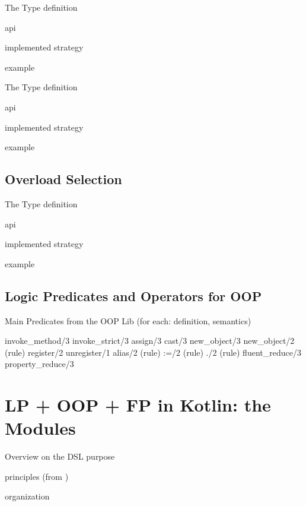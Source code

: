 \documentclass[handout]{beamer}
\begin{document}
\begin{frame}[allowframebreaks]{The  Type}
    definition

    api

    implemented strategy

    example
\end{frame}

\begin{frame}[allowframebreaks]{The  Type}
    definition

    api

    implemented strategy

    example
\end{frame}

\subsection{Overload Selection}

\begin{frame}[allowframebreaks]{The  Type}
    definition

    api

    implemented strategy

    example
\end{frame}

\subsection{Logic Predicates and Operators for OOP}

\begin{frame}[allowframebreaks]{Main Predicates from the OOP Lib}
    (for each: definition, semantics)

    \ttfamily
    invoke\_method/3
    invoke\_strict/3
    assign/3
    cast/3
    new\_object/3
    new\_object/2 (rule)
    register/2
    unregister/1
    alias/2 (rule)
    :=/2 (rule)
    ./2 (rule)
    fluent\_reduce/3
    property\_reduce/3
\end{frame}

\section{LP + OOP + FP in Kotlin: the  Modules}

\begin{frame}[allowframebreaks]{Overview on the DSL}
    purpose

    principles (from \cite{kotlinDSl4PrologWoa2020})

    organization
\end{frame}
\end{document}
